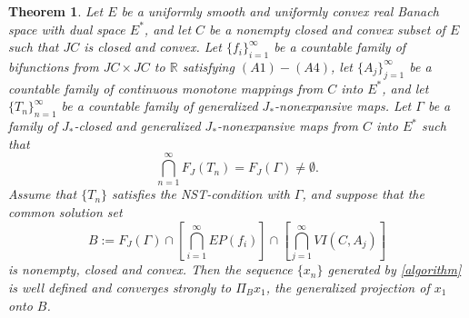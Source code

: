 \documentclass[leqno,12pt]{amsart}
\newtheorem{theorem}{Theorem}[section]
\theoremstyle{definition}
\numberwithin{equation}{section}
\begin{document}
\begin{theorem}\label{mainthm}
Let $E$ be a uniformly smooth and uniformly convex real Banach space with dual space $E^{*}$, and let $C$ be a nonempty closed and convex subset of $E$ such that $JC$ is closed and convex. Let $\{f_i\}_{i=1}^{\infty}$ be a countable family of bifunctions from $JC\times JC$ to $\mathbb{R}$ satisfying $(A1)-(A4)$, let $\{A_j\}_{j=1}^{\infty}$ be a countable family of continuous monotone mappings from $C$ into $E^{*}$, and let $\{T_n\}_{n=1}^{\infty}$ be a countable family of generalized $J_{*}$-nonexpansive maps. Let $\Gamma$ be a family of $J_{*}$-closed and generalized $J_{*}$-nonexpansive maps from $C$ into $E^{*}$ such that
\[
\bigcap_{n=1}^{\infty}F_J(T_n)=F_J(\Gamma)\neq\emptyset.
\]
Assume that $\{T_n\}$ satisfies the NST-condition with $\Gamma$, and suppose that the common solution set
\[
B:=F_J(\Gamma)\cap\left[\bigcap_{i=1}^{\infty}EP(f_i)\right]\cap\left[\bigcap_{j=1}^{\infty}VI(C,A_j)\right]
\]
is nonempty, closed and convex. Then the sequence $\{x_n\}$ generated by \eqref{algorithm} is well defined and converges strongly to $\Pi_Bx_1$, the generalized projection of $x_1$ onto $B$.
\end{theorem}
\end{document}
